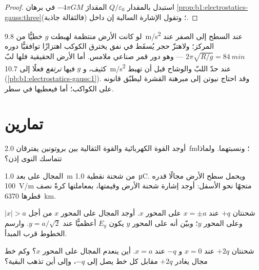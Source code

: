 \begin{proof}
استبدل بالمقدار $Q/\varepsilon_0$ المقدارَ $-4\pi GM$ في برهان
\cref{prop:b1:electrostatics-gauss:three}؛ وتقول الإشارة السالبة إن 
داخل (فالثقالة جاذبة).
\end{proof}

\begin{example}\label{ex:b1:electrostatics-gauss:earth}
لو كانت الأرض منتظمة لهبطت $g$ خطيًّا من \qty{9.8}{m/s^2} عند
السطح إلى الصفر عند المركز؛ ولاهتزّ حجر يُسقَط في نفق يخترق
الكوكب اهتزازًا توافقيًّا دوره $2\pi\sqrt{R/g} =
\qty{84}{min}$ --- وهو دور قمر صناعي ملامس. أما الأرض الحقيقية فلها
لبّ كثيف، و $g$ فيها \emph{ترتفع} فعلًا إلى \qty{10.7}{m/s^2} عند
حدّ اللبّ والوشاح قبل أن تهبط (\cref{pb:b1:electrostatics-gauss:1}).
وقد احتاج نيوتن إلى مبرهنة القشرة ليطبّق قانونه على الكواكب؛ أما  فيعطيها في سطر.
\end{example}

\section{تمارين}

\begin{exercise}[$\star$]\label{exo:b1:electrostatics-gauss:1}
أوجد القوة الكهربائية والقوة الثقالية بين بروتونين يفترقان
\qty{2.0}{fm}؛ ونسبتهما. ولماذا تتماسك النوى إذن؟
\end{exercise}

\begin{exercise}[$\star$]\label{exo:b1:electrostatics-gauss:2}
المجال على بعد \qty{1.0}{m} من شحنة نقطية \qty{1.0}{\micro C}. ويحمل سطح
الأرض مجالًا قدره \qty{100}{V/m} متجهًا نحو الأسفل: أوجد إشارة شحنة
الأرض وقيمتها، بمعاملتها كرةً نصف قطرها \qty{6370}{km}.
\end{exercise}

\begin{exercise}[$\star$]\label{exo:b1:electrostatics-gauss:3}
شحنتان $+q$ عند $x = \pm a$ على المحور $x$. أوجد المجال على المحور $x$
من أجل $|x| > a$ وعلى المحور $y$؛ وبيّن أنه على المحور $y$ يكون $E_y$
أعظميًّا عند $y = a/\sqrt2$. وارسم الخطوط قرب المبدأ.
\end{exercise}

\begin{exercise}[$\star$]\label{exo:b1:electrostatics-gauss:4}
شحنتان $+2q$ عند $x = 0$ و $-q$ عند $x = a$. أين ينعدم المجال على
المحور $x$؟ وكم خط مجال يغادر $+2q$ مقابل كل خط
يصل إلى $-q$، وإلى أين تذهب البقية؟
\end{exercise}

